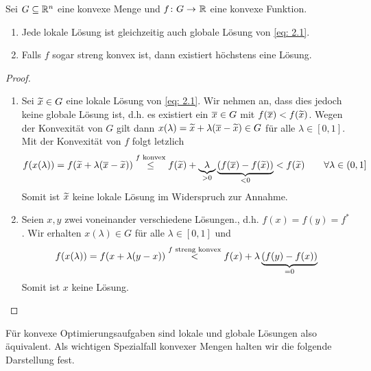 \begin{satz} %
	Sei $G \subseteq \mathbb{R}^n$ eine konvexe Menge und $\abb{f}{G}{\R}$ eine konvexe Funktion.
	\begin{enumerate}
		\item Jede lokale Lösung ist gleichzeitig auch globale Lösung von \eqref{eq: 2.1}.
		\item Falls $f$ sogar streng konvex ist, dann existiert höchstens eine Lösung.
	\end{enumerate}
\end{satz}
\begin{proof}
	\begin{enumerate}
		\item Sei $\widetilde{x} \in G$ eine lokale Lösung von \eqref{eq: 2.1}. Wir nehmen an, dass dies jedoch keine globale Lösung ist, d.h. es existiert ein $\overline{x} \in G$ mit $f(\overline{x}) < f(\widetilde{x})$. Wegen der Konvexität von $G$ gilt dann $x(\lambda) = \widetilde{x} + \lambda(\overline{x} - \widetilde{x}) \in G$ für alle $\lambda \in [0,1]$. Mit der Konvexität von $f$ folgt letzlich
		\begin{equation*}
			f(x(\lambda)) = f(\widetilde{x} + \lambda (\overline{x} - \widetilde{x})) 
			\overset{f \text{ konvex}}{\le} f(\widetilde{x}) + \underbrace{\lambda}_{> 0} \underbrace{\left( f(\overline{x}) - f(\widetilde{x}) \right)}_{< 0}
			< f(\widetilde{x}) \qquad \forall \lambda \in (0,1]
		\end{equation*}
		Somit ist $\widetilde{x}$ keine lokale Lösung im Widerspruch zur Annahme.
		\item Seien $x,y$ zwei voneinander verschiedene Lösungen., d.h. $f(x) = f(y) = f^\ast$. Wir erhalten $x(\lambda) \in G$ für alle $\lambda \in [0,1]$ und
		\begin{equation*}
			f(x(\lambda)) = f(x + \lambda(y-x)) \overset{f \text{ streng konvex}}{<} f(x) + \lambda \underbrace{\left( f(y) - f(x) \right)}_{= 0}
		\end{equation*}
		Somit ist $x$ keine Lösung.
	\end{enumerate}
\end{proof}

Für konvexe Optimierungsaufgaben sind lokale und globale Lösungen also äquivalent. Als wichtigen Spezialfall konvexer Mengen halten wir die folgende Darstellung fest.

